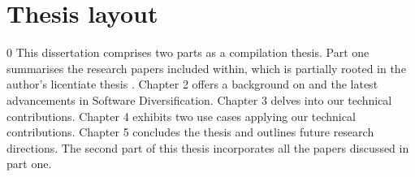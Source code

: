 
\section*{Thesis layout}0
This dissertation comprises two parts as a compilation thesis. 
Part one summarises the research papers included within, which is partially rooted in the author's licentiate thesis \cite{Lic}. 
Chapter 2 offers a background on \Wasm and the latest advancements in Software Diversification. 
Chapter 3 delves into our technical contributions. 
Chapter 4 exhibits two use cases applying our technical contributions. 
Chapter 5 concludes the thesis and outlines future research directions. 
The second part of this thesis incorporates all the papers discussed in part one.

